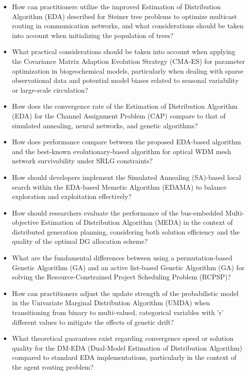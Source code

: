 \begin{itemize}[noitemsep]
    \item How can practitioners utilize the improved Estimation of Distribution Algorithm (EDA) described for Steiner tree problems to optimize multicast routing in communication networks, and what considerations should be taken into account when initializing the population of trees?
    \item What practical considerations should be taken into account when applying the Covariance Matrix Adaption Evolution Strategy (CMA-ES) for parameter optimization in biogeochemical models, particularly when dealing with sparse observational data and potential model biases related to seasonal variability or large-scale circulation?
    \item How does the convergence rate of the Estimation of Distribution Algorithm (EDA) for the Channel Assignment Problem (CAP) compare to that of simulated annealing, neural networks, and genetic algorithms?
    \item How does performance compare between the proposed EDA-based algorithm and the best-known evolutionary-based algorithm for optical WDM mesh network survivability under SRLG constraints?
    \item How should developers implement the Simulated Annealing (SA)-based local search within the EDA-based Memetic Algorithm (EDAMA) to balance exploration and exploitation effectively?
    \item How should researchers evaluate the performance of the bus-embedded Multi-objective Estimation of Distribution Algorithm (MEDA) in the context of distributed generation planning, considering both solution efficiency and the quality of the optimal DG allocation scheme?
    \item What are the fundamental differences between using a permutation-based Genetic Algorithm (GA) and an active list-based Genetic Algorithm (GA) for solving the Resource-Constrained Project Scheduling Problem (RCPSP)?
    \item How can practitioners adjust the update strength of the probabilistic model in the Univariate Marginal Distribution Algorithm (UMDA) when transitioning from binary to multi-valued, categorical variables with 'r' different values to mitigate the effects of genetic drift?
    \item What theoretical guarantees exist regarding convergence speed or solution quality for the DM-EDA (Dual-Model Estimation of Distribution Algorithm) compared to standard EDA implementations, particularly in the context of the agent routing problem?

\end{itemize}
